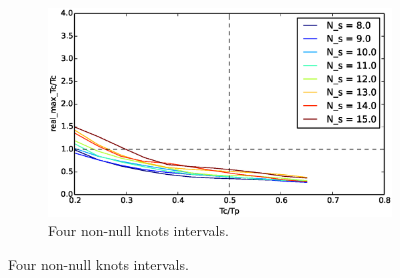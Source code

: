 \begin{figure}
        \centering
        ~ %
        \begin{subfigure}[b]{0.48\textwidth}
                \includegraphics[width=\textwidth]{./img/realtime/Scenario_3__N_knots_4/uni.eps}
                \caption{Four non-null knots intervals.}\label{fig:uni34}
        \end{subfigure}
        

\end{figure}
